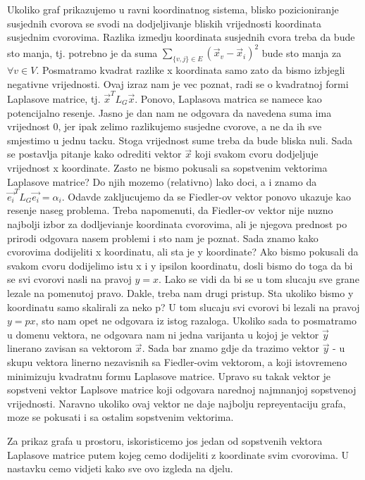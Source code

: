 \documentclass[11pt]{article}
\begin{document}
	Ukoliko graf prikazujemo u ravni koordinatnog sistema, blisko pozicioniranje susjednih cvorova se svodi na dodjeljivanje bliskih vrijednosti koordinata susjednim cvorovima.
    Razlika izmedju koordinata susjednih cvora treba da bude sto manja, tj. potrebno je da suma $\sum_{\{v,j\} \in E} (\vec{x}_v - \vec{x}_i)^2$ bude sto manja za $\forall v \in V$. Posmatramo kvadrat razlike x koordinata samo zato da bismo izbjegli negativne vrijednosti.
    Ovaj izraz nam je vec poznat, radi se o kvadratnoj formi Laplasove matrice, tj. $\vec{x}^T L_G \vec{x}$. Ponovo, Laplasova matrica se namece kao potencijalno resenje.
    Jasno je dan nam ne odgovara da navedena suma ima vrijednost 0, jer ipak zelimo razlikujemo susjedne cvorove, a ne da ih sve smjestimo u jednu tacku. Stoga vrijednost sume treba da bude bliska nuli.
    Sada se postavlja pitanje kako odrediti vektor $\vec{x}$ koji svakom cvoru dodjeljuje vrijednost x koordinate. Zasto ne bismo pokusali sa sopstvenim vektorima Laplasove matrice?
    Do njih mozemo (relativno) lako doci, a i znamo da $\vec{e_i}^T L_G \vec{e_i} = \alpha_i$. Odavde zakljucujemo da se Fiedler-ov vektor ponovo ukazuje kao resenje naseg problema.
    Treba napomenuti, da Fiedler-ov vektor nije nuzno najbolji izbor za dodljevianje koordinata cvorovima, ali je njegova prednost po prirodi odgovara nasem problemi i sto nam je poznat.
    Sada znamo kako cvorovima dodijeliti x koordinatu, ali sta je y koordinate? Ako bismo pokusali da svakom cvoru dodijelimo istu x i y ipsilon koordinatu,
    dosli bismo do toga da bi se svi cvorovi nasli na pravoj $y = x$. Lako se vidi da bi se u tom slucaju sve grane lezale na pomenutoj pravo. Dakle, treba nam drugi pristup. 
    Sta ukoliko bismo y koordinatu samo skalirali za neko p? U tom slucaju svi cvorovi bi lezali na pravoj $y=px$, sto nam opet ne odgovara iz istog razaloga.
    Ukoliko sada to posmatramo u domenu vektora, ne odgovara nam ni jedna varijanta u kojoj je vektor $\vec{y}$ linerano zavisan sa vektorom $\vec{x}$.
    Sada bar znamo gdje da trazimo vektor $\vec{y}$ - u skupu vektora linerno nezavisnih sa Fiedler-ovim vektorom, a koji istovremeno minimizuju kvadratnu formu Laplasove matrice.
    Upravo su takak vektor je sopstveni vektor Laplsove matrice koji odgovara narednoj najmnanjoj sopstvenoj vrijednosti. Naravno ukoliko ovaj vektor ne daje najbolju repreyentaciju grafa, moze se pokusati i sa ostalim sopstvenim vektorima.

    Za prikaz grafa u prostoru, iskoristicemo jos jedan od sopstvenih vektora Laplasove matrice putem kojeg cemo dodijeliti z koordinate svim cvorovima.
    U nastavku cemo vidjeti kako sve ovo izgleda na djelu.
\end{document}
